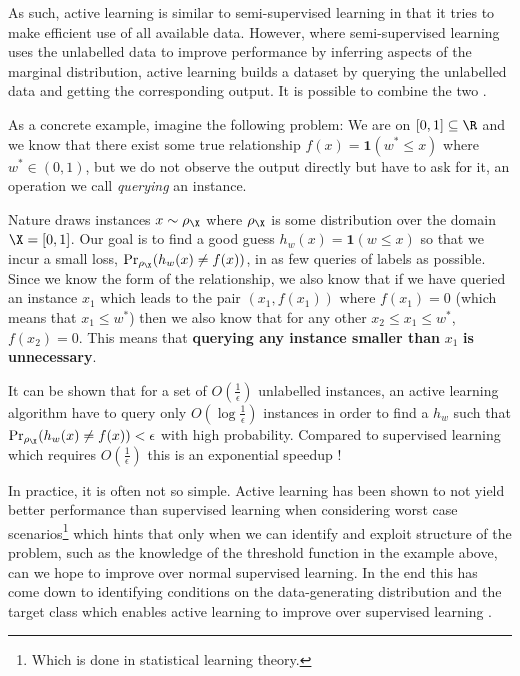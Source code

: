 As such, active learning is similar to semi-supervised learning
\cite{chapelle09_semi_super_learn_o} in that it tries to make efficient use of all
available data. However, where semi-supervised learning uses the unlabelled data
to improve performance by inferring aspects of the marginal distribution, active
learning builds a dataset by querying the unlabelled data and getting the
corresponding output. It is possible to combine the two \cite{zhu03_combin}.

As a concrete example, imagine the following problem: We are on \([0,
1] \subseteq \R\) and we know that there exist some true relationship
\(f(x) = \mathbf{1}(w^{\ast} \leq x)\) where \(w^{\ast} \in (0, 1)\),
but we do not observe the output directly but have to ask for it, an operation we
call \emph{querying} an instance. 

Nature draws instances \(x \sim \rho_{\X}\) where \(\rho_{\X}\) is some
distribution over the domain \(\X = [0, 1]\). Our goal is to find a good guess
\(h_{w}(x) = \mathbf{1}(w \leq x)\) so that we incur a small loss,
\(\Pr_{\rho_{\X}}(h_{w}(x) \neq f(x))\), in as few queries of labels as
possible. Since we know the form of the relationship, we also know that if we
have queried an instance \(x_{1}\) which leads to the pair \((x_{1}, f(x_{1}))\)
where \(f(x_{1}) = 0\) (which means that \(x_{1} \leq w^{\ast}\)) then we also
know that for any other \(x_{2} \leq x_{1} \leq w^{\ast}\), \(f(x_{2}) = 0\).
This means that \textbf{querying any instance smaller than} \(x_{1}\) \textbf{is unnecessary}.

It can be shown that for a set of \(O(\frac{1}{\epsilon})\) unlabelled
instances, an active learning algorithm have to query only \(O(\log
\frac{1}{\epsilon})\) instances in order to find a \(h_{w}\) such that \(\Pr_{\rho_{\X}}(h_{w}(x)
\neq f(x)) < \epsilon\) with high probability. Compared to supervised
learning which requires \(O(\frac{1}{\epsilon})\) this is an exponential
speedup \cite{dasgupta06_coars,dasgupta05_analy}!

In practice, it is often not so simple. Active learning has been shown to not
yield better performance than supervised learning when considering worst case
scenarios\footnote{Which is done in statistical learning theory.} which hints
that only when we can identify and exploit structure of the problem, such as the
knowledge of the threshold function in the example above, can we hope to improve
over normal supervised learning. In the end this has come down to identifying
conditions on the data-generating distribution and the target class which
enables active learning to improve over supervised learning
\cite{balkan15_activ_learn_moder_learn_theor}.

